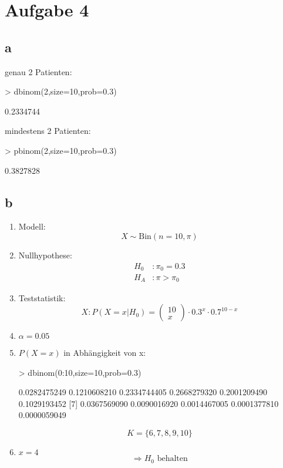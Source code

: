 

\section{Aufgabe 4}
\subsection{a}
genau 2 Patienten: 
\begin{Schunk}
\begin{Sinput}
> dbinom(2,size=10,prob=0.3)
\end{Sinput}
\begin{Soutput}
[1] 0.2334744
\end{Soutput}
\end{Schunk}
mindestens 2 Patienten: 
\begin{Schunk}
\begin{Sinput}
> pbinom(2,size=10,prob=0.3)
\end{Sinput}
\begin{Soutput}
[1] 0.3827828
\end{Soutput}
\end{Schunk}

\subsection{b}
\begin{enumerate}
  \item Modell: \\
        \[ X \sim \text{Bin}(n=10,\pi) \]
  \item Nullhypothese: 
        \[ \begin{array}{ll}
          H_0 &: \pi_0 = 0.3 \\
          H_A &: \pi > \pi_0
        \end{array} \]
  \item Teststatistik: 
        \[ X: P(X=x | H_0) 
        = \left( \begin{array}{l}10\\x\end{array} \right) 
        \cdot 0.3^x \cdot 0.7^{10 - x} \]
  \item $\alpha = 0.05$
  \item $P(X=x)$ in Abhängigkeit von x: 
\begin{Schunk}
\begin{Sinput}
> dbinom(0:10,size=10,prob=0.3)
\end{Sinput}
\begin{Soutput}
 [1] 0.0282475249 0.1210608210 0.2334744405 0.2668279320 0.2001209490 0.1029193452
 [7] 0.0367569090 0.0090016920 0.0014467005 0.0001377810 0.0000059049
\end{Soutput}
\end{Schunk}
        \[ K = \lbrace 6, 7, 8, 9, 10 \rbrace \]
  \item $x=4$\\
        \[ \Rightarrow H_0 \text{ behalten} \]
\end{enumerate}

